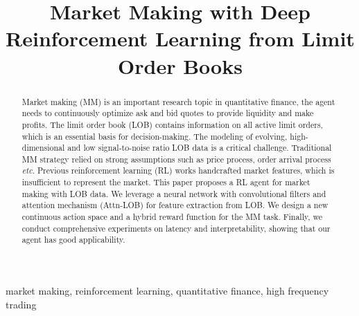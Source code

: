 \documentclass[conference]{IEEEtran}
\begin{document}
\title{Market Making with Deep Reinforcement Learning from Limit Order Books}

\author{
\and
{}
\and
{}
}

\maketitle

\begingroup\renewcommand\thefootnote{*}
\endgroup

\begin{abstract}
Market making (MM) is an important research topic in quantitative finance, the agent needs to continuously optimize ask and bid quotes to provide liquidity and make profits. The limit order book (LOB) contains information on all active limit orders, which is an essential basis for decision-making. The modeling of evolving, high-dimensional and low signal-to-noise ratio LOB data is a critical challenge. Traditional MM strategy relied on strong assumptions such as price process, order arrival process \textit{etc}. Previous reinforcement learning (RL) works handcrafted market features, which is insufficient to represent the market. This paper proposes a RL agent for market making with LOB data. We leverage a neural network with convolutional filters and attention mechanism (Attn-LOB) for feature extraction from LOB. We design a new continuous action space and a hybrid reward function for the MM task. Finally, we conduct comprehensive experiments on latency and interpretability, showing that our agent has good applicability.
\end{abstract}

\begin{IEEEkeywords}
market making, reinforcement learning, quantitative finance, high frequency trading
\end{IEEEkeywords}
\end{document}
